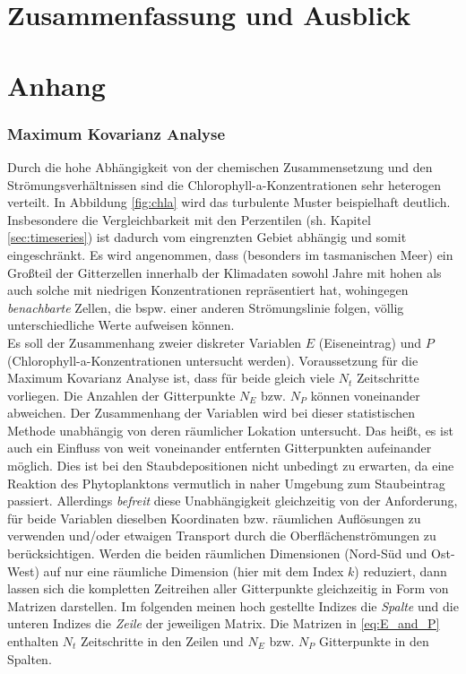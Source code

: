 \documentclass[12pt,a4paper,onecolumn,draft]{scrartcl}
\begin{document}
\section{Zusammenfassung und Ausblick}
\newpage
\printbibliography
\appendix
\section{Anhang}
\subsubsection{Maximum Kovarianz Analyse} \label{sec:mca}
Durch die hohe Abhängigkeit von der chemischen Zusammensetzung und den Strömungsverhältnissen sind die Chlorophyll-a-Konzentrationen sehr heterogen verteilt. In Abbildung \ref{fig:chla} wird das turbulente Muster beispielhaft deutlich. Insbesondere die Vergleichbarkeit mit den Perzentilen (sh. Kapitel \ref{sec:timeseries}) ist dadurch vom eingrenzten Gebiet abhängig und somit eingeschränkt. Es wird angenommen, dass (besonders im tasmanischen Meer) ein Großteil der Gitterzellen innerhalb der Klimadaten sowohl Jahre mit hohen als auch solche mit niedrigen Konzentrationen repräsentiert hat, wohingegen \textit{benachbarte} Zellen, die bspw. einer anderen Strömungslinie folgen, völlig unterschiedliche Werte aufweisen können. \\
Es soll der Zusammenhang zweier diskreter Variablen $E$ (Eiseneintrag) und $P$ (Chlorophyll-a-Konzentrationen untersucht werden). Voraussetzung für die Maximum Kovarianz Analyse ist, dass für beide gleich viele $N_t$ Zeitschritte vorliegen. Die Anzahlen der Gitterpunkte $N_E$ bzw. $N_P$ können voneinander abweichen. Der Zusammenhang der Variablen wird bei dieser statistischen Methode unabhängig von deren räumlicher Lokation untersucht. Das heißt, es ist auch ein Einfluss von weit voneinander entfernten Gitterpunkten aufeinander möglich. Dies ist bei den Staubdepositionen nicht unbedingt zu erwarten, da eine Reaktion des Phytoplanktons vermutlich in naher Umgebung zum Staubeintrag passiert. Allerdings \textit{befreit} diese Unabhängigkeit gleichzeitig von der Anforderung, für beide Variablen dieselben Koordinaten bzw. räumlichen Auflösungen zu verwenden und/oder etwaigen Transport durch die Oberflächenströmungen zu berücksichtigen. Werden die beiden räumlichen Dimensionen (Nord-Süd und Ost-West) auf nur eine räumliche Dimension (hier mit dem  Index $k$) reduziert, dann lassen sich die kompletten  Zeitreihen aller Gitterpunkte gleichzeitig in Form von Matrizen darstellen. Im folgenden meinen hoch gestellte Indizes die \textit{Spalte} und die unteren Indizes die \textit{Zeile} der jeweiligen Matrix. Die Matrizen in \ref{eq:E_and_P} enthalten $N_t$ Zeitschritte in den Zeilen und $N_E$ bzw. $N_P$ Gitterpunkte in den Spalten.
\end{document}
